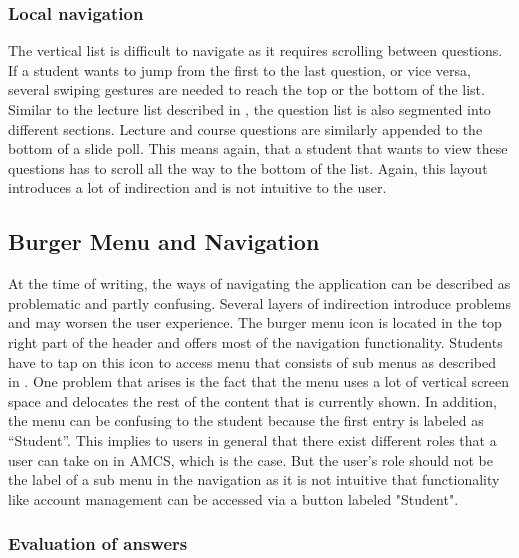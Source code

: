 \subsubsection{Local navigation}

The vertical list is difficult to navigate as it requires scrolling between questions. If a student wants to jump from the first to the last question,  or vice versa, several swiping gestures are needed to reach the top or the bottom of the list.
Similar to the lecture list described in \todosct, the question list is also segmented into different sections. Lecture and course questions are similarly appended to the bottom of a slide poll. This means again, that a student that wants to view these questions has to scroll all the way to the bottom of the list. Again, this layout introduces a lot of indirection and is not intuitive to the user.


\subsection{Burger Menu and Navigation}

At the time of writing, the ways of navigating the application can be described as problematic and partly confusing. Several layers of indirection introduce problems and may worsen the user experience.
The burger menu icon is located in the top right part of the header and offers most of the navigation functionality. Students have to tap on this icon to access menu that consists of sub menus as described in \todosct. 
One problem that arises is the fact that the menu uses a lot of vertical screen space and delocates the rest of the content that is currently shown.
In addition, the menu can be confusing to the student because the first entry is labeled as “Student”. This implies to users in general that there exist different roles that a user can take on in AMCS, which is the case. But the user's role should not be the label of a sub menu in the navigation as it is not intuitive that functionality like account management can be accessed via a button labeled "Student".

\subsubsection{Evaluation of answers}

